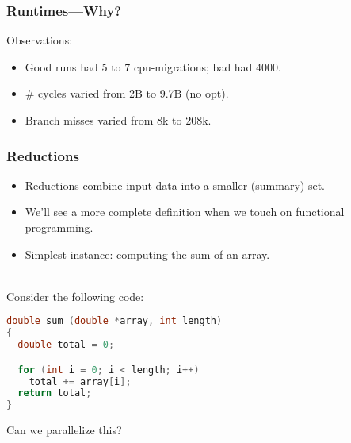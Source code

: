 \begin{frame}[containsverbatim]
  \frametitle{Runtimes---Why?}

  
    Observations:\\[1em]
    \begin{itemize}
    \item Good runs had 5 to 7 cpu-migrations; bad had 4000.
    \item \# cycles varied from 2B to 9.7B (no opt).\\
    \item Branch misses varied from 8k to 208k.
    \end{itemize}
  
    

    


        
    
\end{frame}

\begin{frame}[fragile]
  \frametitle{Reductions}


  \begin{itemize}
    \item Reductions combine input data into a smaller (summary) set.
    \item We'll see a more complete definition when we touch on functional
      programming.
    \item Simplest instance: computing the sum of an array.
  \end{itemize}
~\\

  Consider the following code:

  \begin{lstlisting}[language=C]
double sum (double *array, int length)
{
  double total = 0;

  for (int i = 0; i < length; i++)
    total += array[i];
  return total;
}
  \end{lstlisting}

  Can we parallelize this? 

\end{frame}

